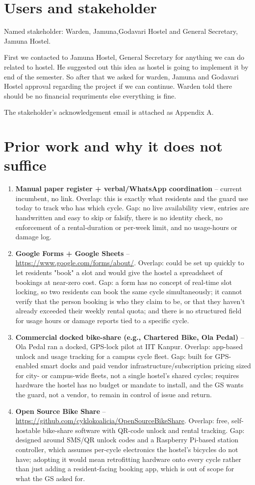 \documentclass[11pt]{article}
\begin{document}
\section{Users and stakeholder}
Named stakeholder: Warden, Jamuna,Godavari Hostel  and General Secretary, Jamuna Hostel.

First we contacted to Jamuna Hostel, General Secretary for anything we can do related to hostel. He suggested out this idea as hostel is going to implement it by end of the semester. So after that we asked for warden, Jamuna and Godavari Hostel approval regarding the project if we can continue. Warden told there should be no financial requriments else everything is fine.

The stakeholder's acknowledgement email is attached as Appendix A.

\section{Prior work and why it does not suffice}
\begin{enumerate}[leftmargin=*]
  \item \textbf{Manual paper register + verbal/WhatsApp coordination} -- current incumbent, no link. Overlap: this is exactly what residents and the guard use today to track who has which cycle. Gap: no live availability view, entries are handwritten and easy to skip or falsify, there is no identity check, no enforcement of a rental-duration or per-week limit, and no usage-hours or damage log.
  \item \textbf{Google Forms + Google Sheets} -- \url{https://www.google.com/forms/about/}. Overlap: could be set up quickly to let residents "book" a slot and would give the hostel a spreadsheet of bookings at near-zero cost. Gap: a form has no concept of real-time slot locking, so two residents can book the same cycle simultaneously; it cannot verify that the person booking is who they claim to be, or that they haven't already exceeded their weekly rental quota; and there is no structured field for usage hours or damage reports tied to a specific cycle.
  \item \textbf{Commercial docked bike-share (e.g., Chartered Bike, Ola Pedal)} -- Ola Pedal ran a docked, GPS-lock pilot at IIT Kanpur. Overlap: app-based unlock and usage tracking for a campus cycle fleet. Gap: built for GPS-enabled smart docks and paid vendor infrastructure/subscription pricing sized for city- or campus-wide fleets, not a single hostel's shared cycles; requires hardware the hostel has no budget or mandate to install, and the GS wants the guard, not a vendor, to remain in control of issue and return.
  \item \textbf{Open Source Bike Share} -- \url{https://github.com/cyklokoalicia/OpenSourceBikeShare}. Overlap: free, self-hostable bike-share software with QR-code unlock and rental tracking. Gap: designed around SMS/QR unlock codes and a Raspberry Pi-based station controller, which assumes per-cycle electronics the hostel's bicycles do not have; adopting it would mean retrofitting hardware onto every cycle rather than just adding a resident-facing booking app, which is out of scope for what the GS asked for.
\end{enumerate}
\end{document}
